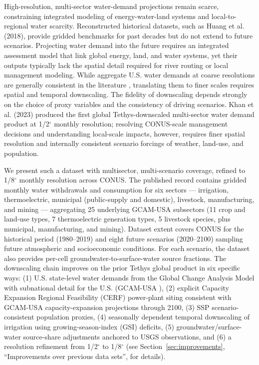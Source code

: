 \documentclass[fleqn,10pt]{wlscirep}
\begin{document}
High-resolution, multi-sector water-demand projections remain scarce, constraining integrated modeling of energy-water-land systems and local-to-regional water scarcity. Reconstructed historical datasets, such as Huang et al. (2018)\cite{Huang2018}, provide gridded benchmarks for past decades but do not extend to future scenarios. Projecting water demand into the future requires an integrated assessment model that link global energy, land, and water systems, yet their outputs typically lack the spatial detail required for river routing or local management modeling\cite{Wada_2017, van_Vliet_2021}. While aggregate U.S. water demands at coarse resolutions are generally consistent in the literature \cite{Zhao_gcamusa_water, naseri2025united, Stets2025USGS}, translating them to finer scales requires spatial and temporal downscaling\cite{hess-17-4555-2013, van_Vliet_2021, Jones_2024}. The fidelity of downscaling depends strongly on the choice of proxy variables and the consistency of driving scenarios. Khan et al. (2023)\cite{Khan2023} produced the first global Tethys-downscaled multi-sector water demand product at 1/2$^{\circ}$ monthly resolution; resolving CONUS-scale management decisions and understanding local-scale impacts, however, requires finer spatial resolution and internally consistent scenario forcings of weather, land-use, and population.

We present such a dataset with multisector, multi-scenario coverage, refined to 1/8$^{\circ}$ monthly resolution across CONUS. The published record contains gridded monthly water withdrawals and consumption for six sectors --- irrigation, thermoelectric, municipal (public-supply and domestic), livestock, manufacturing, and mining --- aggregating 25 underlying GCAM-USA subsectors (11 crop and land-use types, 7 thermoelectric generation types, 5 livestock species, plus municipal, manufacturing, and mining). Dataset extent covers CONUS for the historical period (1980--2019) and eight future scenarios (2020--2100) sampling future atmospheric and socioeconomic conditions. For each scenario, the dataset also provides per-cell groundwater-to-surface-water source fractions. The downscaling chain improves on the prior Tethys global product in six specific ways: (1) U.S. state-level water demands from the Global Change Analysis Model with subnational detail for the U.S. (GCAM-USA \cite{Zhao_gcamusa_water,Zhao2024,Calvin2019GCAM,Binsted_2022}), (2) explicit Capacity Expansion Regional Feasibility (CERF) \cite{Vernon2021} power-plant siting consistent with GCAM-USA capacity-expansion projections through 2100, (3) SSP scenario-consistent population proxies, (4) seasonally dependent temporal downscaling of irrigation using growing-season-index (GSI) deficits, (5) groundwater/surface-water source-share adjustments anchored to USGS observations, and (6) a resolution refinement from 1/2$^{\circ}$ to 1/8$^{\circ}$ (see Section~\ref{sec:improvements}, ``Improvements over previous data sets'', for details).
\end{document}
